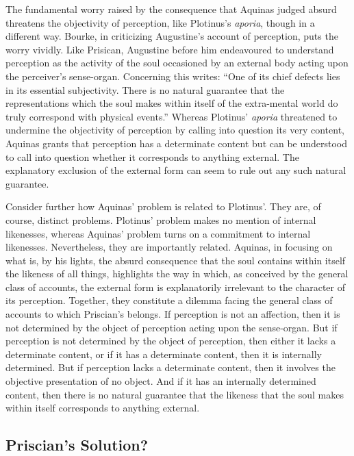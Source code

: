 \documentclass[12pt]{article}
\begin{document}
The fundamental worry raised by the consequence that Aquinas judged absurd threatens the objectivity of perception, like Plotinus's \emph{aporia}, though in a different way. Bourke, in criticizing Augustine's account of perception, puts the worry vividly. Like Prisican, Augustine before him endeavoured to understand perception as the activity of the soul occasioned by an external body acting upon the perceiver's sense-organ. Concerning this \citet[112]{Bourke:1947jk} writes: ``One of its chief defects lies in its essential subjectivity. There is no natural guarantee that the representations which the soul makes within itself of the extra-mental world do truly correspond with physical events.'' Whereas Plotinus' \emph{aporia} threatened to undermine the objectivity of perception by calling into question its very content, Aquinas grants that perception has a determinate content but can be understood to call into question whether it corresponds to anything external. The explanatory exclusion of the external form can seem to rule out any such natural guarantee.

Consider further how Aquinas' problem is related to Plotinus'. They are, of course, distinct problems. Plotinus' problem makes no mention of internal likenesses, whereas Aquinas' problem turns on a commitment to internal likenesses. Nevertheless, they are importantly related. Aquinas, in focusing on what is, by his lights, the absurd consequence that the soul contains within itself the likeness of all things, highlights the way in which, as conceived by the general class of accounts, the external form is explanatorily irrelevant to the character of its perception. Together, they constitute a dilemma facing the general class of accounts to which Priscian's belongs. If perception is not an affection, then it is not determined by the object of perception acting upon the sense-organ. But if perception is not determined by the object of perception, then either it lacks a determinate content, or if it has a determinate content, then it is internally determined. But if perception lacks a determinate content, then it involves the objective presentation of no object. And if it has an internally determined content, then there is no natural guarantee that the likeness that the soul makes within itself corresponds to anything external.



\subsection{Priscian's Solution?} %
\label{sec:_ldots_and_priscian_s_solution}
\end{document}
